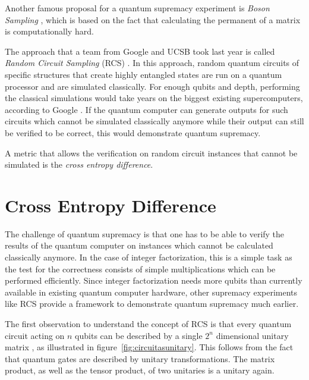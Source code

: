 Another famous proposal for a quantum supremacy experiment is \textit{Boson Sampling} \cite{aaronson2013boson}, which is based on the
fact that calculating the permanent of a matrix is computationally hard.

The approach that a team from Google and UCSB took last year is called \textit{Random
  Circuit Sampling} (RCS) \cite{Boixo2018supremacy, martines2019supremacy}. In this approach, random quantum circuits of specific structures that create highly
entangled states are run on a quantum processor and are simulated classically. For
enough qubits and depth, performing the classical simulations would take years on the biggest 
existing supercomputers, according to Google \cite{martines2019supremacy}. If the quantum computer can generate outputs
for such circuits which cannot be simulated classically anymore while their output can still be
verified to be correct, this would demonstrate quantum supremacy. 

A metric that
allows the verification on random circuit instances that cannot be simulated is
the \textit{cross entropy difference}.

\section{Cross Entropy Difference}

The challenge of quantum supremacy is that one has to be able to verify the
results of the quantum computer on instances which cannot be calculated
classically anymore. In the case of integer factorization, this is a simple task
as the test for the correctness consists of simple multiplications which can be
performed efficiently. Since integer factorization needs more qubits than
currently available in existing quantum computer hardware, other supremacy
experiments like RCS provide a framework to demonstrate quantum supremacy much
earlier.

The first observation to understand the concept of RCS is that every quantum
circuit acting on $n$ qubits can be described by a single $2^n$ dimensional
unitary matrix \cite{nielsen2002quantum}, as illustrated in figure~\ref{fig:circuitasunitary}. This follows
from the fact that quantum gates are described by unitary transformations.
The matrix product, as well as the tensor product, of two unitaries is a unitary again.

